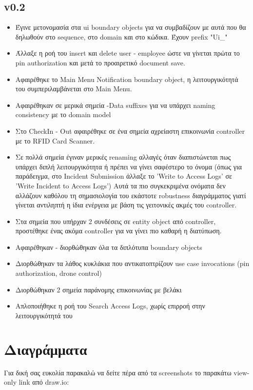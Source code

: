 \documentclass{article}
\begin{document}
\subsection{v0.2}
\begin{itemize}
    \item Έγινε μετονομασία στα ui boundary objects για να συμβαδίζουν με αυτά που θα δηλωθούν στο sequence, στο domain και στο κώδικα. Έχουν prefix "Ui\_"
    \item Άλλαξε η ροή του insert και delete user - employee ώστε να γίνεται πρώτα το pin authorization και μετά το προαιρετικό document save.
    \item Αφαιρέθηκε το Main Menu Notification boundary object, η λειτουργικότητά του συμπεριλαμβάνεται στο Main Menu.
    \item Αφαιρέθηκαν σε μερικά σημεία -Data suffixes για να υπάρχει naming consistency με το domain model
    \item Στο CheckIn - Out αφαιρέθηκε σε ένα σημεία αχρείαστη επικοινωνία controller με το RFID Card Scanner.
    \item Σε πολλά σημεία έγιναν μερικές renaming αλλαγές όταν διαπιστώνεται πως υπάρχει διπλή λειτουργικότητα ή πρέπει να γίνει σαφέστερο το όνομα (όπως για παράδειγμα, στο Incident Submission άλλαξε το 'Write to Access Logs' σε 'Write Incident to Access Logs') Αυτά τα πιο συγκεκριμένα ονόματα δεν αλλάζουν καθόλου τη σημασιολογία του εκάστοτε robustness διαγράμματος γιατί γίνεται αντιληπτή η ίδια ενέργεια με βάση τις γειτονικές ακμές του controller.
    \item Στα σημεία που υπήρχαν 2 συνδέσεις σε entity object από controller, προστέθηκε ένας ακόμα controller για να γίνει πιο καθαρή η διατύπωση.
    
    \hline
    \item Αφαιρέθηκαν - διορθώθηκαν όλα τα διπλότυπα boundary objects
    \item Διορθώθηκαν τα λάθος κυκλάκια που αντικατοπτρίζουν use case invocations (pin authorization, drone control)
    \item Διορθώθηκαν 2 σημεία παράνομης επικοινωνίας με βελάκι
    \item Απλοποιήθηκε η ροή του Search Access Logs, χωρίς επιρροή στην λειτουργικότητά του
    \hline
\end{itemize}

\section{Διαγράμματα}
Για δική σας ευκολία παρακαλώ να δείτε πέρα από τα screenshots το παρακάτω view-only link από draw.io:
\end{document}
